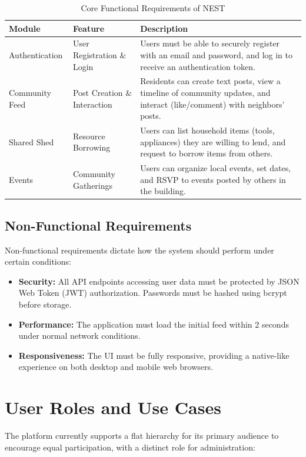 \begin{table}[h]
\centering
\begin{tabular}{|p{2cm}|p{3.5cm}|p{8.5cm}|}
\hline
\textbf{Module} & \textbf{Feature} & \textbf{Description} \\ \hline
Authentication & User Registration \& Login & Users must be able to securely register with an email and password, and log in to receive an authentication token. \\ \hline
Community Feed & Post Creation \& Interaction & Residents can create text posts, view a timeline of community updates, and interact (like/comment) with neighbors' posts. \\ \hline
Shared Shed & Resource Borrowing & Users can list household items (tools, appliances) they are willing to lend, and request to borrow items from others. \\ \hline
Events & Community Gatherings & Users can organize local events, set dates, and RSVP to events posted by others in the building. \\ \hline
\end{tabular}
\caption{Core Functional Requirements of NEST}
\label{tab:functional-requirements}
\end{table}

\subsection{Non-Functional Requirements}
Non-functional requirements dictate how the system should perform under certain conditions:
\begin{itemize}
    \item \textbf{Security:} All API endpoints accessing user data must be protected by JSON Web Token (JWT) authorization. Passwords must be hashed using bcrypt before storage.
    \item \textbf{Performance:} The application must load the initial feed within 2 seconds under normal network conditions.
    \item \textbf{Responsiveness:} The UI must be fully responsive, providing a native-like experience on both desktop and mobile web browsers.
\end{itemize}

\section{User Roles and Use Cases}
The platform currently supports a flat hierarchy for its primary audience to encourage equal participation, with a distinct role for administration:

